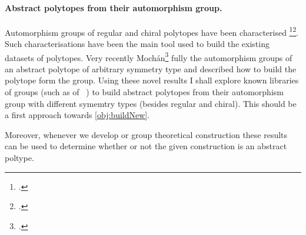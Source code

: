 \paragraph{Abstract polytopes from their automorphism group.}
Automorphism groups of regular and chiral polytopes have been characterised \footcite{DanzerSchulte_1982_RegulareInzidenzkomplexe.I}\footcite{SchulteWeiss_1991_ChiralPolytopes}.
Such characterisations have been the main tool used to build the existing datasets of polytopes.
Very recently Mochán\footcite{Mochan_2021_AbstractPolytopesTheir_PhDThesis} fully  the automorphism groups of an abstract polytope of arbitrary symmetry type and described how to build the polytope form the group.
Using these novel results I shall explore known libraries of groups (such as \smallgrp of \gap\ ) to build abstract polytopes from their automorphism group with different symemtry types (besides regular and chiral).
This should be a first approach towards \cref{obj:buildNew}.

Moreover, whenever we develop or group theoretical construction these results can be used to determine whether or not the given construction is an abstract poltype.

%


